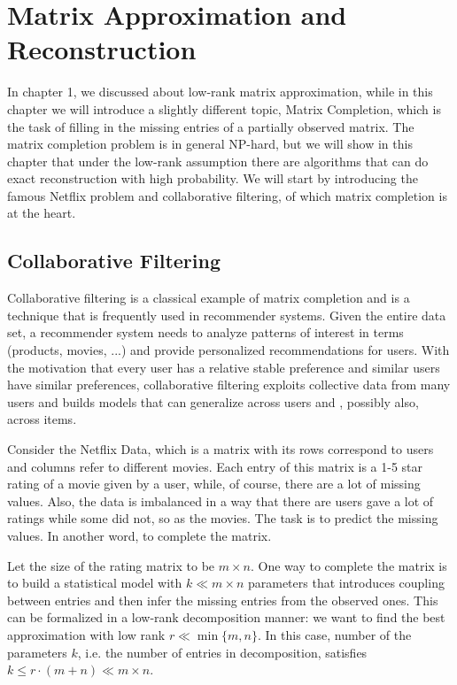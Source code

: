 \documentclass[../book-template.tex]{subfiles}
\begin{document}
\chapter{Matrix Approximation and Reconstruction}
In chapter 1, we discussed about low-rank matrix approximation, while in this chapter we will introduce a slightly different topic, Matrix Completion, which is the task of filling in the missing entries of a partially observed matrix. The matrix completion problem is in general NP-hard, but we will show in this chapter that under the low-rank assumption there are algorithms that can do exact reconstruction with high probability. We will start by introducing the famous Netflix problem and collaborative filtering, of which matrix completion is at the heart.
\section{Collaborative Filtering}
Collaborative filtering is a classical example of matrix completion and is a technique that is frequently used in recommender systems. Given the entire data set, a recommender system needs to analyze patterns of interest in terms (products, movies, ...) and provide personalized recommendations for users. With the motivation that every user has a relative stable preference and similar users have similar preferences, collaborative filtering exploits collective data from many users and builds models that can generalize across users and , possibly also, across items.
\par Consider the Netflix Data, which is a matrix with its rows correspond to users and columns refer to different movies. Each entry of this matrix is a 1-5 star rating of a movie given by a user, while, of course, there are a lot of missing values. Also, the data is imbalanced in a way that there are users gave a lot of ratings while some did not, so as the movies. The task is to predict the missing values. In another word, to complete the matrix.
\par Let the size of the rating matrix to be  $m\times n$. One way to complete the matrix is to build a statistical model with $k\ll m\times n$ parameters that introduces coupling between entries and then infer the missing entries from the observed ones. This can be formalized in a low-rank decomposition manner: we want to find the best approximation with low rank $r\ll \min\{m,n\}$. In this case, number of the parameters $k$, i.e. the number of entries in decomposition, satisfies $k\leq r\cdot (m+n)\ll m\times n$.
\end{document}
